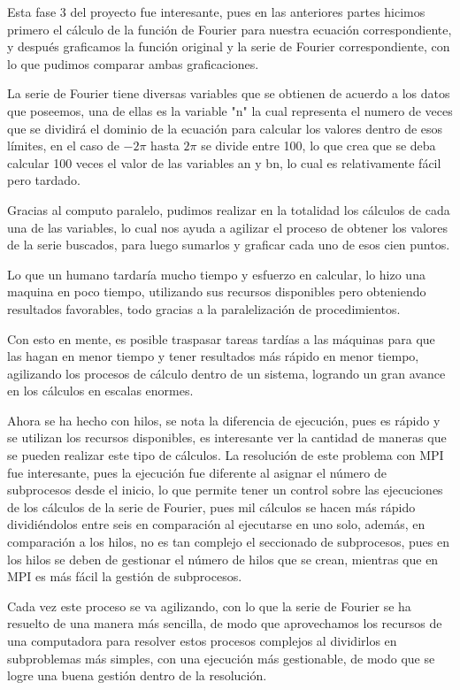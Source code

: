 Esta fase 3 del proyecto fue interesante, pues en las anteriores partes hicimos primero el cálculo de la función de Fourier para nuestra ecuación correspondiente, y después graficamos la función original y la serie de Fourier correspondiente, con lo que pudimos comparar ambas graficaciones.

La serie de Fourier tiene diversas variables que se obtienen de acuerdo a los datos que poseemos, una de ellas es la variable "n" la cual representa el numero de veces que se dividirá el dominio de la ecuación para calcular los valores dentro de esos límites, en el caso de \(-2 \pi\) hasta \(2 \pi\) se divide entre 100, lo que crea que se deba calcular 100 veces el valor de las variables an y bn, lo cual es relativamente fácil pero tardado.

Gracias al computo paralelo, pudimos realizar en la totalidad los cálculos de cada una de las variables, lo cual nos ayuda a agilizar el proceso de obtener los valores de la serie buscados, para luego sumarlos y graficar cada uno de esos cien puntos.

Lo que un humano tardaría mucho tiempo y esfuerzo en calcular, lo hizo una maquina en poco tiempo, utilizando sus recursos disponibles pero obteniendo resultados favorables, todo gracias a la paralelización de procedimientos.

Con esto en mente, es posible traspasar tareas tardías a las máquinas para que las hagan en menor tiempo y tener resultados más rápido en menor tiempo, agilizando los procesos de cálculo dentro de un sistema, logrando un gran avance en los cálculos en escalas enormes.

Ahora se ha hecho con hilos, se nota la diferencia de ejecución, pues es rápido y se utilizan los recursos disponibles, es interesante ver la cantidad de maneras que se pueden realizar este tipo de cálculos.
La resolución de este problema con MPI fue interesante, pues la ejecución fue diferente al asignar el número de subprocesos desde el inicio, lo que permite tener un control sobre las ejecuciones de los cálculos de la serie de Fourier, pues mil cálculos se hacen más rápido dividiéndolos entre seis en comparación al ejecutarse en uno solo, además, en comparación a los hilos, no es tan complejo el seccionado de subprocesos, pues en los hilos se deben de gestionar el número de hilos que se crean, mientras que en MPI es más fácil la gestión de subprocesos. 

Cada vez este proceso se va agilizando, con lo que la serie de Fourier se ha resuelto de una manera más sencilla, de modo que aprovechamos los recursos de una computadora para resolver estos procesos complejos al dividirlos en subproblemas más simples, con una ejecución más gestionable, de modo que se logre una buena gestión dentro de la resolución.
